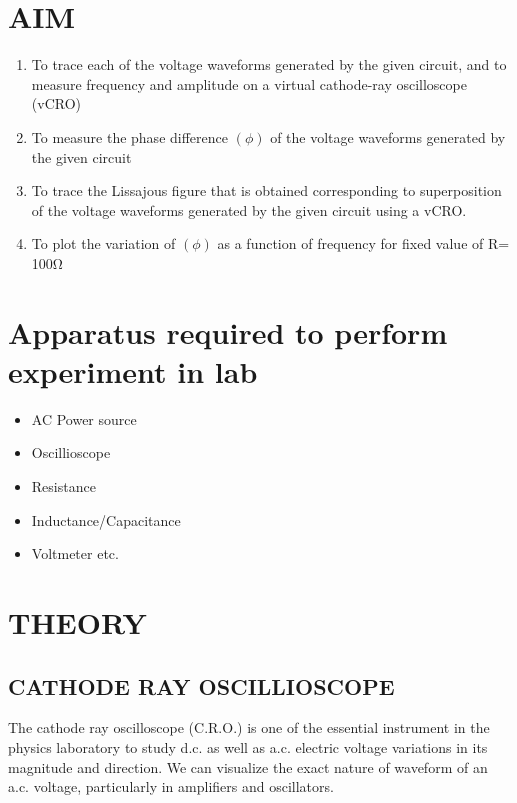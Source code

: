 \documentclass{article}
\begin{document}
\section{\LARGE AIM}
\large
\begin{enumerate}
    \item To trace each of the voltage waveforms generated by the given circuit, and to measure frequency and amplitude on a virtual cathode-ray oscilloscope (vCRO)
    \item To measure the phase difference $(\phi)$ of the voltage waveforms generated by the given circuit
    \item To trace the Lissajous figure that is obtained corresponding to superposition of the voltage waveforms generated by the given circuit using a vCRO.
    \item To  plot  the  variation  of $(\phi)$ as  a  function  of  frequency  for  fixed  value  of R= 100Ω
\end{enumerate}
\section{\LARGE Apparatus required to perform experiment in lab}
\begin{itemize}
    \item AC Power source
    \item Oscillioscope
    \item Resistance
    \item Inductance/Capacitance
    \item Voltmeter etc.
\end{itemize}


\section{\LARGE THEORY}
\subsection{CATHODE RAY OSCILLIOSCOPE}
The cathode ray oscilloscope (C.R.O.) is one of the essential instrument in the physics laboratory to study d.c. as well as a.c. electric voltage variations in its magnitude and direction. We can visualize the exact nature of waveform of an a.c. voltage, particularly in amplifiers and oscillators.
\end{document}
